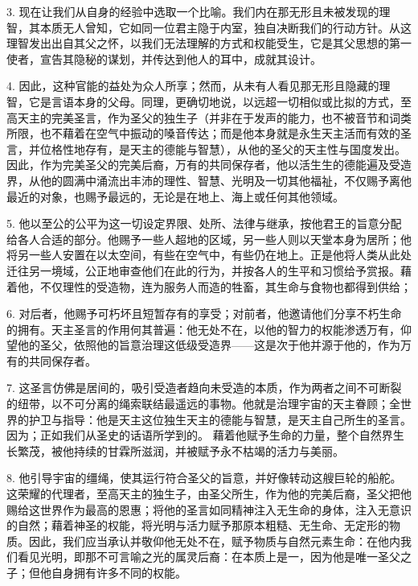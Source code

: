 3. 现在让我们从自身的经验中选取一个比喻。我们内在那无形且未被发现的理智，其本质无人曾知，它如同一位君主隐于内室，独自决断我们的行动方针。从这理智发出出自其父之怀，以我们无法理解的方式和权能受生，它是其父思想的第一使者，宣告其隐秘的谋划，并传达到他人的耳中，成就其设计。\par

4. 因此，这种官能的益处为众人所享；然而，从未有人看见那无形且隐藏的理智，它是言语本身的父母。同理，更确切地说，以远超一切相似或比拟的方式，至高天主的完美圣言，作为圣父的独生子（并非在于发声的能力，也不被音节和词类所限，也不藉着在空气中振动的嗓音传达；而是他本身就是永生天主活而有效的圣言，并位格性地存有，是天主的德能与智慧），从他的圣父的天主性与国度发出。因此，作为完美圣父的完美后裔，万有的共同保存者，他以活生生的德能遍及受造界，从他的圆满中涌流出丰沛的理性、智慧、光明及一切其他福祉，不仅赐予离他最近的对象，也赐予最远的，无论是在地上、海上或任何其他领域。\par

5. 他以至公的公平为这一切设定界限、处所、法律与继承，按他君王的旨意分配给各人合适的部分。他赐予一些人超地的区域，另一些人则以天堂本身为居所；他将另一些人安置在以太空间，有些在空气中，有些仍在地上。正是他将人类从此处迁往另一境域，公正地审查他们在此的行为，并按各人的生平和习惯给予赏报。藉着他，不仅理性的受造物，连为服务人而造的牲畜，其生命与食物也都得到供给；\par

6. 对后者，他赐予可朽坏且短暂存有的享受；对前者，他邀请他们分享不朽生命的拥有。天主圣言的作用何其普遍：他无处不在，以他的智力的权能渗透万有，仰望他的圣父，依照他的旨意治理这低级受造界——这是次于他并源于他的，作为万有的共同保存者。\par

7. 这圣言仿佛是居间的，吸引受造者趋向未受造的本质，作为两者之间不可断裂的纽带，以不可分离的绳索联结最遥远的事物。他就是治理宇宙的天主眷顾；全世界的护卫与指导：他是天主这位独生天主的德能与智慧，是天主自己所生的圣言。因为；正如我们从圣史的话语所学到的。 藉着他赋予生命的力量，整个自然界生长繁茂，被他持续的甘霖所滋润，并被赋予永不枯竭的活力与美丽。\par

8. 他引导宇宙的缰绳，使其运行符合圣父的旨意，并好像转动这艘巨轮的船舵。这荣耀的代理者，至高天主的独生子，由圣父所生，作为他的完美后裔，圣父把他赐给这世界作为最高的恩惠；将他的圣言如同精神注入无生命的身体，注入无意识的自然；藉着神圣的权能，将光明与活力赋予那原本粗糙、无生命、无定形的物质。因此，我们应当承认并敬仰他无处不在，赋予物质与自然元素生命：在他内我们看见光明，即那不可言喻之光的属灵后裔：在本质上是一，因为他是唯一圣父之子；但他自身拥有许多不同的权能。\par

